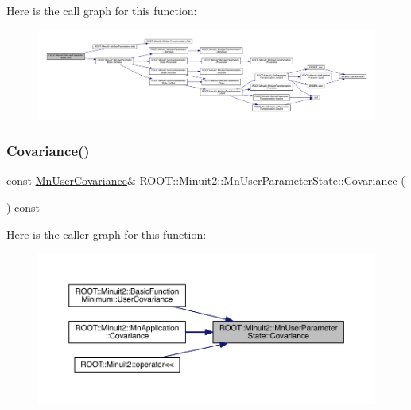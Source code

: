 Here is the call graph for this function\+:\nopagebreak
\begin{figure}[H]
\begin{center}
\leavevmode
\includegraphics[width=350pt]{d3/de0/classROOT_1_1Minuit2_1_1MnUserParameterState_a553bf18d39208bf83a8d7898176b20e6_cgraph}
\end{center}
\end{figure}
\mbox{\label{classROOT_1_1Minuit2_1_1MnUserParameterState_a0e8ae6fe41fbc8eb1c218742ed080e0e}} 
\subsubsection{\texorpdfstring{Covariance()}{Covariance()}\hspace{0.1cm}{\footnotesize\ttfamily [1/2]}}
{\footnotesize\ttfamily const \mbox{\hyperlink{classROOT_1_1Minuit2_1_1MnUserCovariance}{Mn\+User\+Covariance}}\& R\+O\+O\+T\+::\+Minuit2\+::\+Mn\+User\+Parameter\+State\+::\+Covariance (\begin{DoxyParamCaption}{ }\end{DoxyParamCaption}) const\hspace{0.3cm}{\ttfamily [inline]}}

Here is the caller graph for this function\+:\nopagebreak
\begin{figure}[H]
\begin{center}
\leavevmode
\includegraphics[width=350pt]{d3/de0/classROOT_1_1Minuit2_1_1MnUserParameterState_a0e8ae6fe41fbc8eb1c218742ed080e0e_icgraph}
\end{center}
\end{figure}
\mbox{\label{classROOT_1_1Minuit2_1_1MnUserParameterState_a0e8ae6fe41fbc8eb1c218742ed080e0e}} 
